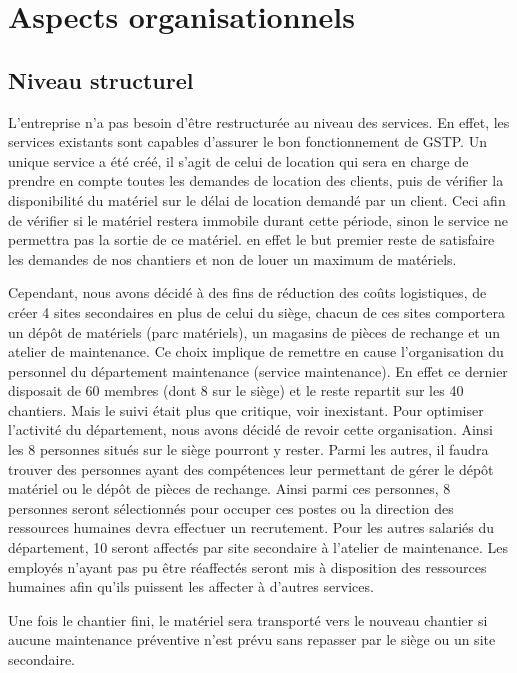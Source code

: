 \section{Aspects organisationnels}
        \subsection{Niveau structurel}
        L'entreprise n'a pas besoin d'être restructurée au niveau des services. En effet, les services existants sont capables d'assurer le bon fonctionnement de GSTP. Un unique service a été créé, il s'agit de celui de location qui sera en charge de prendre en compte toutes les demandes de location des clients, puis de vérifier la disponibilité du matériel sur le délai de location demandé par un client. Ceci afin de vérifier si le matériel restera immobile durant cette période, sinon le service ne permettra pas la sortie de ce matériel. en effet le but premier reste de satisfaire les demandes de nos chantiers et non de louer un maximum de matériels.

         Cependant, nous avons décidé à des fins de réduction des coûts logistiques, de créer 4 sites secondaires en plus de celui du siège, chacun de ces sites comportera un dépôt de matériels (parc matériels), un magasins de pièces de rechange et un atelier de maintenance. Ce choix implique de remettre en cause l'organisation du personnel du département maintenance (service maintenance). En effet ce dernier disposait de 60 membres (dont 8 sur le siège) et le reste repartit sur les 40 chantiers. Mais le suivi était plus que critique, voir inexistant. Pour optimiser l'activité du département, nous avons décidé de revoir cette organisation. Ainsi les 8 personnes situés sur le siège pourront y rester. Parmi les autres, il faudra trouver des personnes ayant des compétences leur permettant de gérer le dépôt matériel ou le dépôt de pièces de rechange. Ainsi parmi ces personnes, 8 personnes seront sélectionnés pour occuper ces postes ou la direction des ressources humaines devra effectuer un recrutement. Pour les autres salariés du département,
10 seront affectés par site secondaire à l'atelier de maintenance. Les employés n'ayant pas pu être réaffectés seront mis à disposition des ressources humaines afin qu'ils puissent les affecter à d'autres services.

Une fois le chantier fini, le matériel sera transporté vers le nouveau chantier si aucune maintenance préventive n'est prévu sans repasser par le siège ou un site secondaire.

